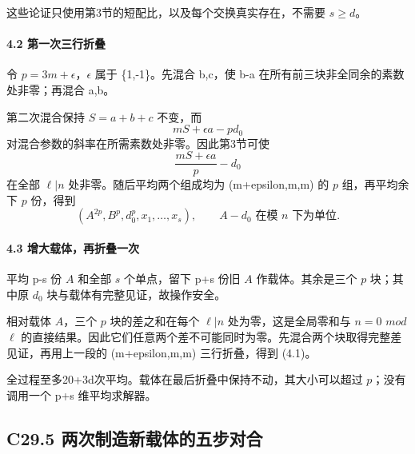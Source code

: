 \documentclass[11pt,a4paper]{article}
\theoremstyle{definition}
\numberwithin{equation}{section}
\begin{document}
{这些论证只使用第3节的短配比，以及每个交换真实存在，不需要} {\ensuremath{s\ge d}。}

\paragraph*{\texorpdfstring{{4.2} {第一次三行折叠}}{4.2 第一次三行折叠}}\label{C29-h186}

{令} {\ensuremath{p=3m+\epsilon }，\ensuremath{\epsilon }} {属于} {\{1,-1\}。先混合} {b,c，使} {b-a} {在所有前三块非全同余的素数处非零；再混合} {a,b。}

{第二次混合保持} {\ensuremath{S=a+b+c}} {不变，而} \[
mS+\epsilon a-pd_0
\] {对混合参数的斜率在所需素数处非零。因此第3节可使} \[
\frac{mS+\epsilon a}{p}-d_0
\] {在全部} {\ensuremath{\ell |n}} {处非零。随后平均两个组成均为} {(m+epsilon,m,m)} {的} {\ensuremath{p}} {组，再平均余下} {\ensuremath{p}} {份，得到} \[
(A^{2p},B^p,d_0^p,x_1,\ldots,x_s),
\qquad A-d_0\text{ 在模 }n\text{ 下为单位}.
\]

\paragraph*{\texorpdfstring{{4.3} {增大载体，再折叠一次}}{4.3 增大载体，再折叠一次}}\label{C29-h187}

{平均} {p-s} {份} {\ensuremath{A}} {和全部} {\ensuremath{s}} {个单点，留下} {p+s} {份旧} {\ensuremath{A}} {作载体。其余是三个} {\ensuremath{p}} {块；其中原} {\ensuremath{d_{0}}} {块与载体有完整见证，故操作安全。}

{相对载体} {\ensuremath{A}，三个} {\ensuremath{p}} {块的差之和在每个} {\ensuremath{\ell |n}} {处为零，这是全局零和与} {\ensuremath{n=0}} {\ensuremath{mod}} {\ensuremath{\ell }} {的直接结果。因此它们任意两个差不可能同时为零。先混合两个块取得完整差见证，再用上一段的} {(m+epsilon,m,m)} {三行折叠，得到} {(4.1)。}

{全过程至多20+3d次平均。载体在最后折叠中保持不动，其大小可以超过} {\ensuremath{p}；没有调用一个} {p+s} {维平均求解器。}

\subsection*{\texorpdfstring{{C29.5} {两次制造新载体的五步对合}}{C29.5 两次制造新载体的五步对合}}\label{C29-h188}
\end{document}
